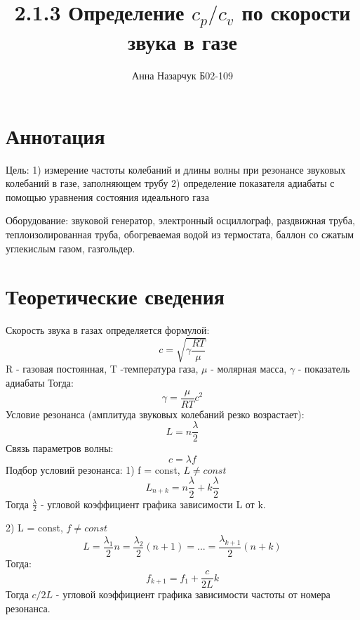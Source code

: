 \documentclass[a4paper,12pt]{article} %
\author{Анна Назарчук Б02-109}
\title{2.1.3 Определение $c_p/c_v$ по скорости звука в газе}
\date{}
\begin{document}
\maketitle
\section{Аннотация}
Цель: 1) измерение частоты колебаний и длины волны при резонансе звуковых колебаний в газе, заполняющем трубу 
2) определение показателя адиабаты с помощью уравнения состояния идеального газа

Оборудование: звуковой генератор, электронный осциллограф, раздвижная труба, теплоизолированная труба, обогреваемая водой из термостата, баллон со сжатым углекислым газом, газгольдер.

\section{Теоретические сведения}
Скорость звука в газах определяется формулой:
\begin{equation}
c = \sqrt{\gamma \frac{RT}{\mu}}
\end{equation}
R - газовая постоянная, T -температура газа, $\mu$ - молярная масса, $\gamma$ - показатель адиабаты
Тогда:
\begin{equation}
\gamma = \frac{\mu}{RT}c^2
\end{equation} 
Условие резонанса (амплитуда звуковых колебаний резко возрастает):
\begin{equation}
L = n\frac{\lambda}{2}
\end{equation}
Связь параметров волны:
\begin{equation}
c=\lambda f
\end{equation}
Подбор условий резонанса:
1) f = const, $L\neq const$
\begin{equation}
L_{n+k} = n\frac{\lambda}{2} + k \frac{\lambda}{2}
\end{equation}
Тогда $\frac{\lambda}{2}$ - угловой коэффициент графика зависимости L от k.


2) L = const, $f\neq const$
\begin{equation}
L=\frac{\lambda_1}{2}n=\frac{\lambda_2}{2}(n+1)=...=\frac{\lambda_{k+1}}{2}(n+k)
\end{equation}
Тогда:
\begin{equation}
f_{k+1} = f_1+\frac{c}{2L}k
\end{equation}
Тогда $c/2L$ - угловой коэффициент графика зависимости частоты от номера резонанса.
\end{document}
